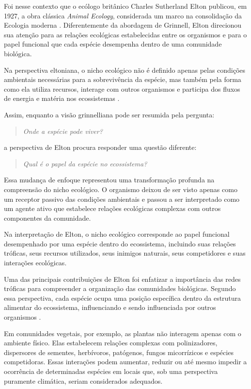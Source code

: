 Foi nesse contexto que o ecólogo britânico Charles Sutherland Elton publicou, em 1927, a obra clássica \textit{Animal Ecology}, considerada um marco na consolidação da Ecologia moderna \parencite{elton1927}. Diferentemente da abordagem de Grinnell, Elton direcionou sua atenção para as relações ecológicas estabelecidas entre os organismos e para o papel funcional que cada espécie desempenha dentro de uma comunidade biológica.

Na perspectiva eltoniana, o nicho ecológico não é definido apenas pelas condições ambientais necessárias para a sobrevivência da espécie, mas também pela forma como ela utiliza recursos, interage com outros organismos e participa dos fluxos de energia e matéria nos ecossistemas \parencite{elton1927,soberon2007}.

Assim, enquanto a visão grinnelliana pode ser resumida pela pergunta:

\begin{quote}
	\textit{Onde a espécie pode viver?}
\end{quote}

a perspectiva de Elton procura responder uma questão diferente:

\begin{quote}
	\textit{Qual é o papel da espécie no ecossistema?}
\end{quote}

Essa mudança de enfoque representou uma transformação profunda na compreensão do nicho ecológico. O organismo deixou de ser visto apenas como um receptor passivo das condições ambientais e passou a ser interpretado como um agente ativo que estabelece relações ecológicas complexas com outros componentes da comunidade.

\begin{conceito}
	Na interpretação de Elton, o nicho ecológico corresponde ao papel funcional desempenhado por uma espécie dentro do ecossistema, incluindo suas relações tróficas, seus recursos utilizados, seus inimigos naturais, seus competidores e suas interações ecológicas.
\end{conceito}

Uma das principais contribuições de Elton foi enfatizar a importância das redes tróficas para compreender a organização das comunidades biológicas. Segundo essa perspectiva, cada espécie ocupa uma posição específica dentro da estrutura alimentar do ecossistema, influenciando e sendo influenciada por outros organismos \parencite{elton1927,pimm1982}.

Em comunidades vegetais, por exemplo, as plantas não interagem apenas com o ambiente físico. Elas estabelecem relações complexas com polinizadores, dispersores de sementes, herbívoros, patógenos, fungos micorrízicos e espécies competidoras. Essas interações podem aumentar, reduzir ou até mesmo impedir a ocorrência de determinadas espécies em locais que, sob uma perspectiva puramente climática, seriam considerados adequados.

